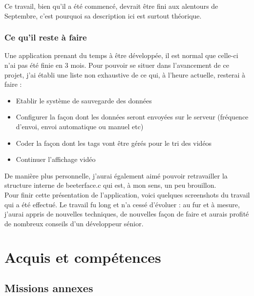 \documentclass[11pt,french,a4paper]{report}
\begin{document}
Ce travail, bien qu'il a été commencé, devrait être fini aux alentours de Septembre, c'est pourquoi sa description ici
est surtout théorique. \\
        \subsection{Ce qu'il reste à faire}
Une application prenant du temps à être développée, il est normal que celle-ci n'ai pas été finie en 3 mois. Pour pouvoir se situer
dans l'avancement de ce projet, j'ai établi une liste non exhaustive de ce qui, à l'heure actuelle, resterai à faire : \\ 
\begin{itemize}
    \item Etablir le système de sauvegarde des données
    \item Configurer la façon dont les données seront envoyées sur le serveur (fréquence d'envoi, envoi automatique ou manuel etc) 
    \item Coder la façon dont les tags vont être  gérés pour le tri des vidéos 
    \item Continuer l'affichage vidéo
\end{itemize} 
De manière plus personnelle, j'aurai également aimé pouvoir retravailler la structure interne de beeterface.c qui est, à mon sens,
un peu brouillon. \\
Pour finir cette présentation de l'application, voici quelques screenshots du travail qui a été effectué.
Le travail fu long et n'a cessé d'évoluer : au fur et à mesure, j'aurai appris de nouvelles techniques, de nouvelles façon de faire 
et aurais profité de nombreux conseils d'un développeur sénior. \\
\chapter{Acquis et compétences}
    \section{Missions annexes}
\end{document}
